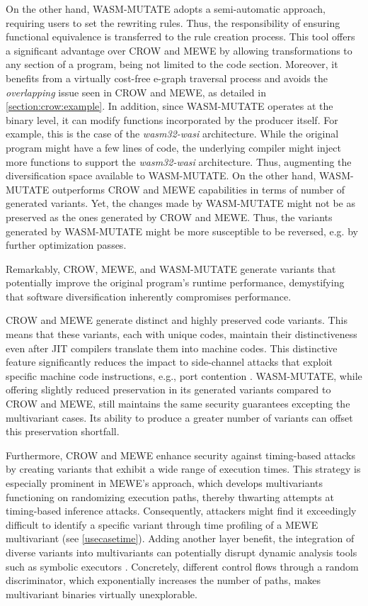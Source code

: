 On the other hand, WASM-MUTATE adopts a semi-automatic approach, requiring users to set the rewriting rules. Thus, the responsibility of ensuring functional equivalence is transferred to the rule creation process.
This tool offers a significant advantage over CROW and MEWE by allowing transformations to any section of a \wasm program, being not limited to the code section. 
Moreover, it benefits from a virtually cost-free e-graph traversal process and avoids the \emph{overlapping}  issue seen in CROW and MEWE, as detailed in \autoref{section:crow:example}. 
In addition, since WASM-MUTATE operates at the binary level, it can modify functions incorporated by the \Wasm producer itself.
For example, this is the case of the \emph{wasm32-wasi} architecture.
While the original program might have a few lines of code, the underlying compiler might inject more functions to support the \emph{wasm32-wasi} architecture.
Thus, augmenting the diversification space available to WASM-MUTATE.
On the other hand, WASM-MUTATE outperforms CROW and MEWE capabilities in terms of number of generated variants.
Yet, the changes made by WASM-MUTATE might not be as preserved as the ones generated by CROW and MEWE.
Thus, the variants generated by WASM-MUTATE might be more susceptible to be reversed, e.g. by further optimization passes.

Remarkably, CROW, MEWE, and WASM-MUTATE generate variants that potentially improve the original program's runtime performance, demystifying that software diversification inherently compromises performance.

CROW and MEWE generate distinct and highly preserved code variants. 
This means that these variants, each with unique \Wasm codes, maintain their distinctiveness even after JIT compilers translate them into machine codes. 
This distinctive feature significantly reduces the impact to side-channel attacks that exploit specific machine code instructions, e.g., port contention \cite{10.1145/3488932.3517411}.
WASM-MUTATE, while offering slightly reduced preservation in its generated variants compared to CROW and MEWE, still maintains the same security guarantees excepting the multivariant cases.
Its ability to produce a greater number of variants can offset this preservation shortfall.


Furthermore, CROW and MEWE enhance security against timing-based attacks by creating variants that exhibit a wide range of execution times. 
This strategy is especially prominent in MEWE’s approach, which develops multivariants functioning on randomizing execution paths, thereby thwarting attempts at timing-based inference attacks. 
Consequently, attackers might find it exceedingly difficult to identify a specific variant through time profiling of a MEWE multivariant (see \autoref{usecasetime}).
Adding another layer benefit, the integration of diverse variants into multivariants can potentially disrupt dynamic analysis tools such as symbolic executors \cite{wasmixer}. 
Concretely, different control flows through a random discriminator, which exponentially increases the number of paths, makes multivariant binaries virtually unexplorable.



